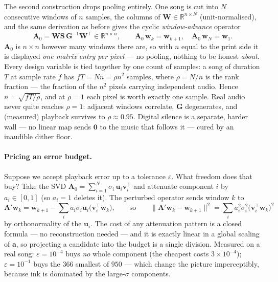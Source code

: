 \documentclass[11pt]{article}
\newcommand{\mA}{\bm{A}}
\newcommand{\mAo}{\bm{A}_0}
\newcommand{\mS}{\bm{S}}
\newcommand{\mG}{\bm{G}}
\newcommand{\mW}{\bm{W}}
\newcommand{\R}{\mathbb{R}}
\newcommand{\norm}[1]{\lVert #1 \rVert}
\begin{document}
The second construction drops pooling entirely. One song is cut into $N$
consecutive windows of $n$ samples, the columns of
$\mW \in \R^{n \times N}$ (unit-normalised), and the same derivation as
before gives the cyclic \emph{window-advance} operator
\begin{equation}
  \mAo = \mW\mS\,\mG^{-1}\mW^{\top} \in \R^{n\times n},
  \qquad \mAo\,\bm{w}_k = \bm{w}_{k+1},\quad \mAo\,\bm{w}_N = \bm{w}_1 .
\end{equation}
$\mAo$ is $n \times n$ however many windows there are, so with $n$ equal
to the print side it is displayed \emph{one matrix entry per pixel} ---
no pooling, nothing to be honest \emph{about}. Every design variable is
tied together by one count of samples: a song of duration $T$ at sample
rate $f$ has $fT = Nn = \rho n^2$ samples, where $\rho = N/n$ is the rank
fraction --- the fraction of the $n^2$ pixels carrying independent audio.
Hence $n = \sqrt{fT/\rho}$, and at $\rho = 1$ each pixel is worth exactly
one sample. Real audio never quite reaches $\rho = 1$: adjacent windows
correlate, $\mG$ degenerates, and (measured) playback survives to
$\rho \approx 0.95$. Digital silence is a separate, harder wall --- no
linear map sends $\bm{0}$ to the music that follows it --- cured by an
inaudible dither floor.

\paragraph{Pricing an error budget.}
Suppose we accept playback error up to a tolerance $\varepsilon$. What
freedom does that buy? Take the SVD
$\mAo = \sum_{i=1}^{N} \sigma_i\, \bm{u}_i \bm{v}_i^{\top}$ and attenuate
component $i$ by $a_i \in [0,1]$ (so $a_i = 1$ deletes it). The perturbed
operator sends window $k$ to
\begin{equation}
  \mA'\bm{w}_k
  = \bm{w}_{k+1} - \sum_i a_i \sigma_i \bm{u}_i
    \bigl(\bm{v}_i^{\top}\bm{w}_k\bigr),
  \qquad\text{so}\qquad
  \norm{\mA'\bm{w}_k - \bm{w}_{k+1}}^2
  = \sum_i a_i^2 \sigma_i^2 \bigl(\bm{v}_i^{\top}\bm{w}_k\bigr)^2
\end{equation}
by orthonormality of the $\bm{u}_i$. The cost of any attenuation pattern
is a closed formula --- no reconstruction needed --- and it is exactly
linear in a global scaling of $\bm{a}$, so projecting a candidate into
the budget is a single division. Measured on a real song: $\varepsilon =
10^{-4}$ buys \emph{no} whole component (the cheapest costs
$3\times10^{-4}$); $\varepsilon = 10^{-1}$ buys the $366$ smallest of
$950$ --- which change the picture imperceptibly, because ink is
dominated by the large-$\sigma$ components.
\end{document}
